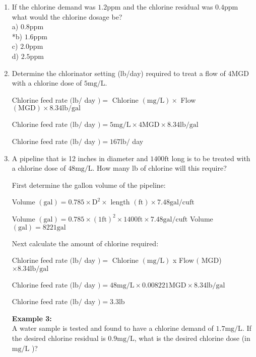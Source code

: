 \documentclass{article}
\begin{document}
\begin{enumerate}
  \item If the chlorine demand was $1.2 \mathrm{ppm}$ and the chlorine residual was $0.4 \mathrm{ppm}$ what would the chlorine dosage be?\\
a) $0.8 \mathrm{ppm}$\\
*b) $1.6 \mathrm{ppm}$\\
c) $2.0 \mathrm{ppm}$\\
d) $2.5 \mathrm{ppm}$\\


\item Determine the chlorinator setting (lb/day) required to treat a flow of $4 \mathrm{MGD}$ with a chlorine dose of $5 \mathrm{mg} / \mathrm{L}$.

Chlorine feed rate $(\mathrm{lb} /$ day $)=$ Chlorine $(\mathrm{mg} / \mathrm{L}) \times$ Flow $(\mathrm{MGD}) \times 8.34 \mathrm{lb} / \mathrm{gal}$

Chlorine feed rate $(\mathrm{lb} /$ day $)=5 \mathrm{mg} / \mathrm{L} \times 4 \mathrm{MGD} \times 8.34 \mathrm{lb} / \mathrm{gal}$

Chlorine feed rate $(\mathrm{lb} /$ day $)=167 \mathrm{lb} /$ day

\item A pipeline that is 12 inches in diameter and $1400 \mathrm{ft}$ long is to be treated with a chlorine dose of $48 \mathrm{mg} / \mathrm{L}$. How many lb of chlorine will this require?

First determine the gallon volume of the pipeline:

Volume $(\mathrm{gal})=0.785 \times \mathrm{D}^{2} \times$ length $(\mathrm{ft}) \times 7.48 \mathrm{gal} / \mathrm{cu} \mathrm{ft}$

Volume $(\mathrm{gal})=0.785 \times(1 \mathrm{ft})^{2} \times 1400 \mathrm{ft} \times 7.48 \mathrm{gal} / \mathrm{cu} \mathrm{ft}$ Volume $(\mathrm{gal})=8221 \mathrm{gal}$

Next calculate the amount of chlorine required:

Chlorine feed rate $(\mathrm{lb} /$ day $)=$ Chlorine $(\mathrm{mg} / \mathrm{L})$ x Flow $($ MGD) $\times 8.34 \mathrm{lb} / \mathrm{gal}$

Chlorine feed rate $(\mathrm{lb} /$ day $)=48 \mathrm{mg} / \mathrm{L} \times 0.008221 \mathrm{MGD} \times 8.34 \mathrm{lb} / \mathrm{gal}$

Chlorine feed rate $(\mathrm{lb} /$ day $)=3.3 \mathrm{lb}$

\textbf{Example 3:}\\
A water sample is tested and found to have a chlorine demand of $1.7 \mathrm{mg} / \mathrm{L}$. If the desired chlorine residual is $0.9 \mathrm{mg} / \mathrm{L}$, what is the desired chlorine dose (in $\mathrm{mg} / \mathrm{L}$ )?


\end{enumerate}
\end{document}
